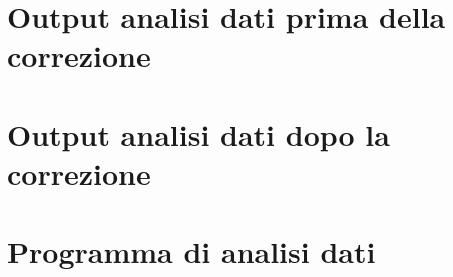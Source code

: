 \documentclass[
    rmp,
    reprint, 
    superscriptaddress, 
    altaffilletter, 
    amsmath, 
    amssymb, 
    a4paper]{revtex4-2}
\begin{document}
\setcounter{table}{0}
\renewcommand{\thetable}{A-\Roman{table}}

\section{Output analisi dati prima della correzione}
\label{appendix:output}

\section{Output analisi dati dopo la correzione}
\label{appendix:out_correct}

\section{Programma di analisi dati}

\end{document}

